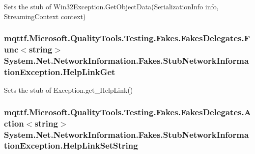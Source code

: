 Sets the stub of Win32\-Exception.\-Get\-Object\-Data(\-Serialization\-Info info, Streaming\-Context context)

\hypertarget{class_system_1_1_net_1_1_network_information_1_1_fakes_1_1_stub_network_information_exception_a110da7884b9d2b075d92278bf95c4921}{
\subsubsection[{Help\-Link\-Get}]{\setlength{\rightskip}{0pt plus 5cm}mqttf.\-Microsoft.\-Quality\-Tools.\-Testing.\-Fakes.\-Fakes\-Delegates.\-Func$<$string$>$ System.\-Net.\-Network\-Information.\-Fakes.\-Stub\-Network\-Information\-Exception.\-Help\-Link\-Get}}\label{class_system_1_1_net_1_1_network_information_1_1_fakes_1_1_stub_network_information_exception_a110da7884b9d2b075d92278bf95c4921}


Sets the stub of Exception.\-get\-\_\-\-Help\-Link()

\hypertarget{class_system_1_1_net_1_1_network_information_1_1_fakes_1_1_stub_network_information_exception_abc0fa6472e68fadd3ad3f0b978438c03}{
\subsubsection[{Help\-Link\-Set\-String}]{\setlength{\rightskip}{0pt plus 5cm}mqttf.\-Microsoft.\-Quality\-Tools.\-Testing.\-Fakes.\-Fakes\-Delegates.\-Action$<$string$>$ System.\-Net.\-Network\-Information.\-Fakes.\-Stub\-Network\-Information\-Exception.\-Help\-Link\-Set\-String}}\label{class_system_1_1_net_1_1_network_information_1_1_fakes_1_1_stub_network_information_exception_abc0fa6472e68fadd3ad3f0b978438c03}


